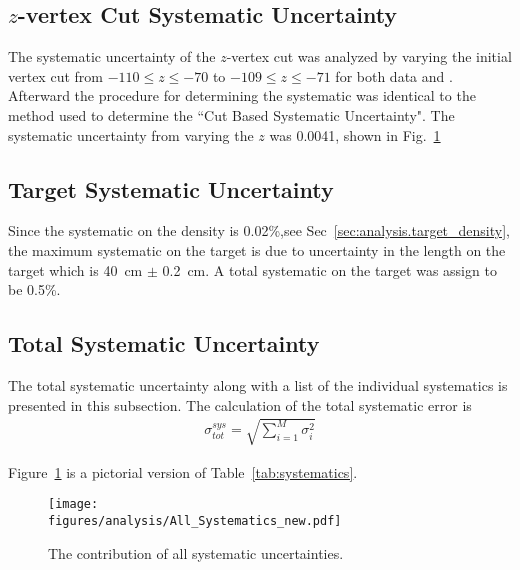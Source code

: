 					
 					\subsection{$z$-vertex Cut Systematic Uncertainty}
 					The systematic uncertainty of the $z$-vertex cut was analyzed by varying the initial vertex cut from $-110 \le z \le -70$ to $-109 \le z \le -71$ for both data and . Afterward the procedure for determining the systematic was identical to the method used to determine the ``Cut Based Systematic Uncertainty". The systematic uncertainty from varying the $z$ was 0.0041, shown in Fig.~\ref{fig:results.syserr}
 					
 					\subsection{Target Systematic Uncertainty}
 					Since the systematic on the density is 0.02\%,see Sec~\ref{sec:analysis.target_density}, the maximum systematic on the target is due to uncertainty in the length on the target which is 40~cm $\pm$ 0.2~cm. A total systematic on the target was assign to be 0.5\%. 
 					
 					\subsection{Total Systematic Uncertainty}
 					The total systematic uncertainty along with a list of the individual systematics is presented in this subsection. The calculation of the total systematic error is 
 					\begin{align}
 						\sigma^{sys}_{tot} = \sqrt{\sum_{i=1}^{M}\sigma_i^2}
 					\end{align}
 					
 					Figure~\ref{fig:results.syserr} is a pictorial version of Table~\ref{tab:systematics}.
 					\begin{figure}[h!]\begin{center}
 							\texttt{[image: \\figures/analysis/All\_Systematics\_new.pdf]}
 							\caption[The contribution of all systematic uncertainties]{\label{fig:results.syserr}The contribution of all systematic uncertainties.}
 						\end{center}\end{figure} 